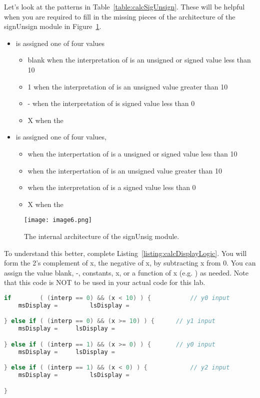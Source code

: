 Let's look at the patterns in Table~\ref{table:calcSigUnsign}.  These will be helpful when you are
required to fill in the
missing pieces of the architecture of the signUnsign module in Figure~\ref{fig:calcSigUnSigArch}.
\begin{itemize}

	\item {} is assigned one of four values
	\begin{itemize}
		\item  blank when the interpretation of  is an unsigned or signed value less than  10
		\item 1 when the interpretation of  is an unsigned value greater than 10
		\item - when the interpretation of  is signed value less than 0
		\item X when the 
	\end{itemize}

	\item {} is assigned one of four values, 
	\begin{itemize}
		\item {} when the interpertation of  is a unsigned or signed value less than 10
		\item {} when the interpertation of  is an unsigned value greater than 10
		\item {} when the interpretation of  is a signed value less than 0
		\item X when the 
	\end{itemize}
\end{itemize}

\begin{figure}[ht]
\texttt{[image:  image6.png]}
\caption{The internal architecture of the signUnsig module.}
\label{fig:calcSigUnSigArch}
\end{figure}



To understand this better, complete Listing~\ref{listing:calcDisplayLogic}. 
You will form the 2's complement of x, the negative of x, by subtracting x
from 0.  You can assign the value blank, -, constants, x, or a function of x 
(e.g. ) as needed. Note that this code is NOT to be used in your 
actual code for this lab.


\begin{lstlisting}[language=Verilog,
 caption={Logic that determines the output of the 4:1 muxes in Figure~\ref{fig:calcSevenSeg}.},
 label={listing:calcDisplayLogic},
 frame=single]
if        ( (interp == 0) && (x < 10) ) {			// y0 input
    msDisplay = 		lsDisplay = 	

} else if ( (interp == 0) && (x >= 10) ) {		// y1 input
    msDisplay =		lsDisplay =

} else if ( (interp == 1) && (x >= 0) ) {		// y0 input
    msDisplay =		lsDisplay = 

} else if ( (interp == 1) && (x < 0) ) {			// y2 input
    msDisplay = 		lsDisplay = 

}
\end{lstlisting}



